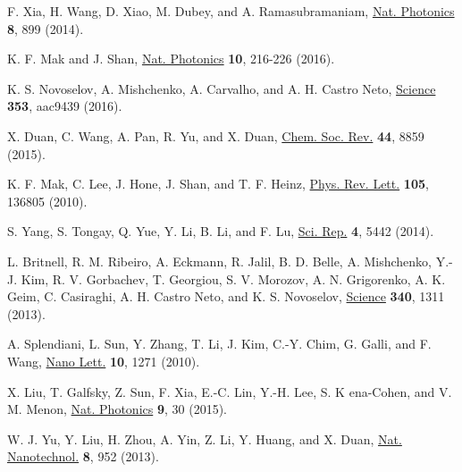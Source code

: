 \documentclass[%
 reprint,%
 amssymb, amsmath,%
 aip,cha,%
]{revtex4-1}
\begin{document}
\begin{thebibliography}{9}\label{sec:TeXbooks}%


F. Xia, H. Wang, D. Xiao, M. Dubey, and A. Ramasubramaniam,
\href{http://www.nature.com/nphoton/journal/v8/n12/full/nphoton.2014.271.html?foxtrotcallback=true}{Nat. Photonics} \textbf{8}, 899 (2014).

K. F. Mak and J. Shan,
\href{https://www.nature.com/nphoton/journal/v10/n4/full/nphoton.2015.282.html}{Nat. Photonics} \textbf{10}, 216-226 (2016).

K. S. Novoselov, A. Mishchenko, A. Carvalho, and A. H. Castro Neto,
\href{http://science.sciencemag.org/content/353/6298/aac9439}{Science} \textbf{353}, aac9439 (2016).

X. Duan, C. Wang, A. Pan, R. Yu, and X. Duan,
\href{http://pubs.rsc.org/en/Content/ArticleLanding/2015/CS/C5CS00507H#!divAbstract}{Chem. Soc. Rev.} \textbf{44}, 8859 (2015).

K. F. Mak, C. Lee, J. Hone, J. Shan, and T. F. Heinz,
\href{https://journals.aps.org/prl/abstract/10.1103/PhysRevLett.105.136805}{Phys. Rev. Lett.} \textbf{105}, 136805 (2010).

S. Yang, S. Tongay, Q. Yue, Y. Li, B. Li, and F. Lu,
\href{https://www.nature.com/articles/srep05442}{Sci. Rep.} \textbf{4}, 5442 (2014).

L. Britnell, R. M. Ribeiro, A. Eckmann, R. Jalil, B. D. Belle, A. Mishchenko, Y.-J. Kim, R. V. Gorbachev, T. Georgiou, S. V. Morozov, A. N. Grigorenko, A. K. Geim, C. Casiraghi, A. H. Castro Neto, and K. S. Novoselov,
\href{http://science.sciencemag.org/content/340/6138/1311}{Science} \textbf{340}, 1311 (2013).

A. Splendiani, L. Sun, Y. Zhang, T. Li, J. Kim, C.-Y. Chim, G. Galli, and F. Wang,
\href{http://pubs.acs.org/doi/abs/10.1021/nl903868w}{Nano Lett.} \textbf{10}, 1271 (2010).

X. Liu, T. Galfsky, Z. Sun, F. Xia, E.-C. Lin, Y.-H. Lee, S. K ena-Cohen, and V. M. Menon,
\href{https://www.nature.com/nphoton/journal/v9/n1/full/nphoton.2014.304.html}{Nat. Photonics} \textbf{9}, 30 (2015).

W. J. Yu, Y. Liu, H. Zhou, A. Yin, Z. Li, Y. Huang, and X. Duan,
\href{https://www.nature.com/nnano/journal/v8/n12/full/nnano.2013.219.html}{Nat. Nanotechnol.} \textbf{8}, 952 (2013).


\end{thebibliography}
\end{document}
